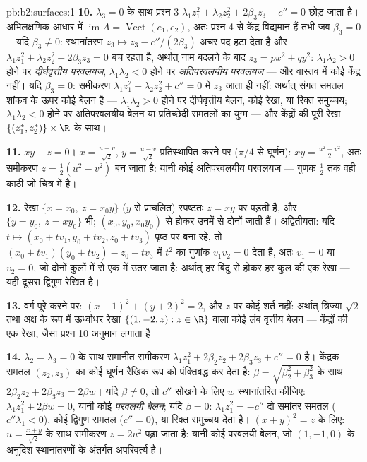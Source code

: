 \begin{solution}{pb:b2:surfaces:1}
\textbf{10.} $\lambda_3 = 0$ के साथ प्रश्न 3 $\lambda_1z_1^2 + \lambda_2z_2^2 + 2\beta_3z_3 + c'' = 0$ छोड़ जाता है। अभिलक्षणिक
आधार में $\operatorname{im}A = \operatorname{Vect}(e_1,
e_2)$, अतः प्रश्न 4 से केंद्र विद्यमान हैं तभी जब $\beta_3 = 0$।
यदि $\beta_3 \neq 0$: स्थानांतरण $z_3 \mapsto z_3 -
c''/(2\beta_3)$ अचर पद हटा देता है और $\lambda_1z_1^2
+ \lambda_2z_2^2 + 2\beta_3z_3 = 0$ बच रहता है,
अर्थात् नाम बदलने के बाद $z_3 = px^2 +
qy^2$: $\lambda_1\lambda_2 > 0$ होने पर \emph{दीर्घवृत्तीय
परवलयज}, $\lambda_1\lambda_2 < 0$ होने पर \emph{अतिपरवलयीय परवलयज} --- और वास्तव में
कोई केंद्र नहीं। यदि $\beta_3 = 0$: समीकरण $\lambda_1z_1^2 + \lambda_2z_2^2 +
c'' = 0$ में $z_3$ आता ही नहीं:
अर्थात्  संगत समतल शांकव के ऊपर कोई बेलन है --- $\lambda_1\lambda_2 > 0$ होने
पर दीर्घवृत्तीय बेलन, कोई रेखा, या रिक्त समुच्चय; $\lambda_1\lambda_2 < 0$ होने पर
अतिपरवलयीय बेलन या प्रतिच्छेदी समतलों का युग्म --- और केंद्रों की
पूरी रेखा $\{(z_1^*, z_2^*)\} \times \R$ के साथ।

\textbf{11.} $xy - z = 0$। $x = \frac{u +
v}{\sqrt2}$, $y = \frac{u - v}{\sqrt2}$ प्रतिस्थापित करने पर ($\pi/4$ से
घूर्णन): $xy = \frac{u^2 - v^2}2$, अतः समीकरण $z =
\frac12(u^2 - v^2)$ बन जाता है: यानी कोई अतिपरवलयीय
परवलयज --- गुणक $\frac12$ तक वही काठी जो चित्र में है।

\textbf{12.} रेखा $\{x = x_0,\ z = x_0y\}$ ($y$ से प्राचलित) स्पष्टतः $z = xy$ पर पड़ती
है, और $\{y = y_0,\ z =
xy_0\}$ भी; $(x_0, y_0, x_0y_0)$ से होकर उनमें से दोनों जाती हैं। अद्वितीयता:
यदि $t \mapsto (x_0 + tv_1, y_0 + tv_2, z_0 +
tv_3)$ पृष्ठ पर बना रहे, तो $(x_0
+ tv_1)(y_0 + tv_2) - z_0 - tv_3$ में $t^2$ का गुणांक $v_1v_2 = 0$ देता है,
अतः $v_1 = 0$ या $v_2 = 0$, जो दोनों कुलों में से एक में उतर जाता है:
अर्थात् हर बिंदु से होकर हर कुल की एक रेखा --- यही दूसरा द्विगुण
रेखित  है।

\textbf{13.} वर्ग पूरे करने पर: $(x - 1)^2 + (y + 2)^2 = 2$, और $z$ पर कोई शर्त नहीं:
अर्थात् त्रिज्या $\sqrt2$ तथा अक्ष के रूप में ऊर्ध्वाधर रेखा $\{(1, -2, z) : z \in
\R\}$ वाला
कोई लंब वृत्तीय बेलन --- केंद्रों की एक रेखा, जैसा प्रश्न 10
अनुमान लगाता है।

\textbf{14.} $\lambda_2 = \lambda_3 = 0$ के साथ समानीत समीकरण $\lambda_1z_1^2 + 2\beta_2z_2 + 2\beta_3z_3 + c''
= 0$ है। केंद्रक समतल $(z_2, z_3)$
का कोई घूर्णन रैखिक रूप को पंक्तिबद्ध कर देता है: $\beta = \sqrt{\beta_2^2 + \beta_3^2}$ के साथ $2\beta_2z_2 + 2\beta_3z_3 = 2\beta w$।
यदि $\beta \neq 0$, तो $c''$ सोखने के लिए $w$ स्थानांतरित कीजिए: $\lambda_1z_1^2 + 2\beta w =
0$, यानी
कोई \emph{परवलयी बेलन}; यदि $\beta = 0$: $\lambda_1z_1^2 = -c''$ दो समांतर समतल ($c''
\lambda_1 < 0$),
कोई द्विगुण समतल ($c'' = 0$), या रिक्त समुच्चय देता है। $(x + y)^2 = z$ के लिए:
$u = \frac{x + y}{\sqrt2}$ के साथ समीकरण $z = 2u^2$ पढ़ा जाता है: यानी कोई परवलयी बेलन, जो
$(1, -1, 0)$ के अनुदिश स्थानांतरणों के अंतर्गत अपरिवर्त्य है।


\end{solution}
